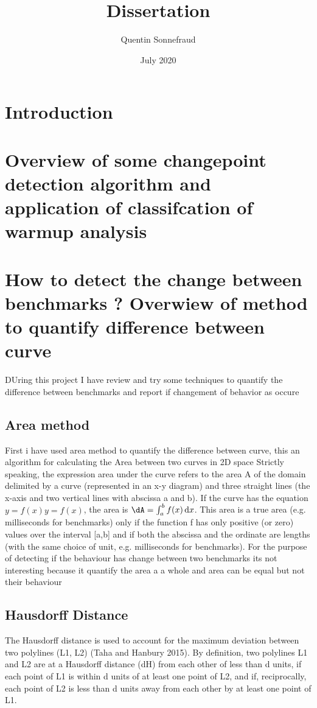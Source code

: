\documentclass{article}
\title{Dissertation}
\author{Quentin Sonnefraud}
\date{July 2020}
\begin{document}
\maketitle


\section{Introduction}

\section{Overview of some changepoint detection algorithm and application of classifcation of warmup analysis}

\section{ How to detect the change between benchmarks ? Overwiew of method to quantify difference between curve}

DUring this project I have review and try some techniques to quantify the difference between benchmarks and report if changement of behavior as occure

\subsection{Area method}

First i have used area method to quantify the difference between curve, this an algorithm for calculating the Area between two curves in 2D space
Strictly speaking, the expression area under the curve refers to the area A of the domain delimited by a curve (represented in an x-y diagram) and three straight lines (the x-axis and two vertical lines with abscissa a and b). If the curve has the equation $y=f(x)y=f(x)$, the area is $\dA=\int _{a}^{b}f(x)\,\mathrm {d} x$. This area is a true area (e.g. milliseconds for benchmarks) only if the function f has only positive (or zero) values over the interval [a,b] and if both the abscissa and the ordinate are lengths (with the same choice of unit, e.g. milliseconds for benchmarks).
For the purpose of detecting if the behaviour has change between two benchmarks its not interesting because it quantify the area a a whole and area can be equal but not their behaviour

\subsection{Hausdorff Distance }
The Hausdorff distance is used to account for the maximum deviation between two polylines (L1, L2) (Taha and Hanbury 2015). By definition, two polylines L1 and L2 are at a Hausdorff distance (dH) from each other of less than d units, if each point of L1 is within d units of at least one point of L2, and if, reciprocally, each point of L2 is less than d units away from each other by at least one
point of L1.
\end{document}
